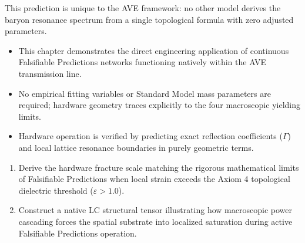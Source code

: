 This prediction is unique to the AVE framework: no other model derives the baryon resonance spectrum from a single topological formula with zero adjusted parameters.
\begin{summarybox}
\begin{itemize}
    \item This chapter demonstrates the direct engineering application of continuous Falsifiable Predictions networks functioning natively within the AVE transmission line.
    \item No empirical fitting variables or Standard Model mass parameters are required; hardware geometry traces explicitly to the four macroscopic yielding limits.
    \item Hardware operation is verified by predicting exact reflection coefficients ($\Gamma$) and local lattice resonance boundaries in purely geometric terms.
\end{itemize}
\end{summarybox}

\begin{exercisebox}
\begin{enumerate}
    \item Derive the hardware fracture scale matching the rigorous mathematical limits of Falsifiable Predictions when local strain exceeds the Axiom 4 topological dielectric threshold ($\varepsilon > 1.0$).
    \item Construct a native LC structural tensor illustrating how macroscopic power cascading forces the spatial substrate into localized saturation during active Falsifiable Predictions operation.
\end{enumerate}
\end{exercisebox}
